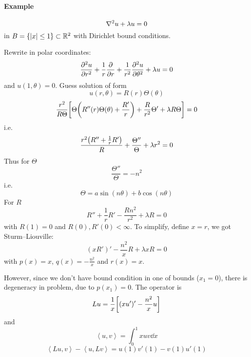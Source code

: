 \paragraph{Example}
$$
\laplacian{u} + \lambda u = 0
$$
in $B =\qty{ \abs{x} \leq 1 } \subset \mathbb{R}^2 $ with Dirichlet bound conditions.

Rewrite in polar coordinates:
$$\pdv[2]{u}{r} + \frac{1}{r} \pdv{r} + \frac{1}{r^2} \pdv[2]{u}{\theta} +\lambda u = 0$$
and $u(1,\theta) = 0$. Guess solution of form
$$u(r,\theta) = R(r)\Theta(\theta)$$
$$\frac{r^2}{R\Theta}\qty[ \Theta \qty(R''(r) \Theta(\theta) + \frac{R'}{r})+ \frac{R}{r^2}\Theta' + \lambda R\Theta ] = 0$$
i.e.
$$\frac{r^2 \qty(R''+\frac{1}{r}R')}{R} + \frac{\Theta''}{\Theta} + \lambda r^2 = 0$$
Thus for $\Theta$
$$\frac{\Theta''}{\Theta} = -n^2$$
i.e.
$$\Theta = a\sin(n\theta) + b\cos(n\theta)$$
For $R$
$$R'' + \frac{1}{r} R' - \frac{Rn^2}{r^2} + \lambda R = 0$$
with $R(1)=0$ and $R(0),R'(0) < \infty$.
To simplify, define $x=r$, we got Sturm–Liouville:
$$(xR')' - \frac{n^2}{x}R + \lambda xR = 0$$
with $p(x) = x$, $q(x) = -\frac{n^2}{x}$ and $r(x) = x$.

However, since we don't have bound condition in one of bounds ($x_1=0$), there is degeneracy in problem, due to $p(x_1)=0$. The operator is
$$Lu = \frac{1}{x} \qty[(xu')'-\frac{n^2}{x}u]$$
and
$$\left\langle u,v \right\rangle = \int_0^1 xuv \dd{x}$$
$$\left\langle Lu,v \right\rangle - \left\langle u,Lv \right\rangle = u(1)v'(1) - v(1) u'(1)$$
